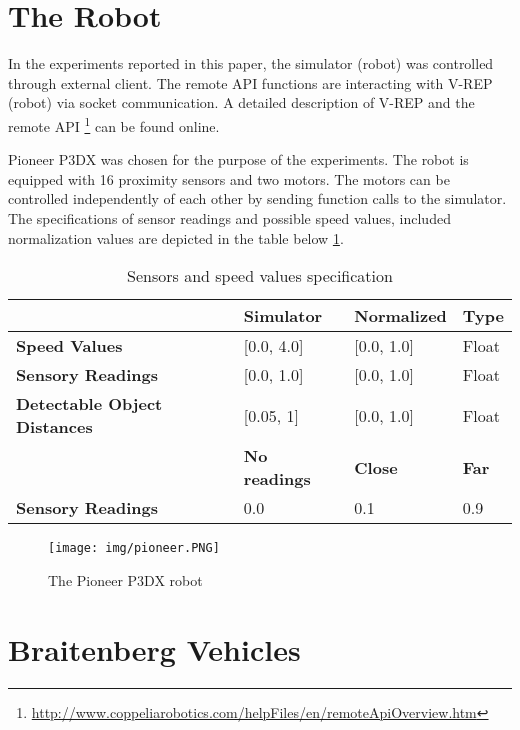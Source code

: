 \documentclass[format=acmsmall, review=false, screen=true]{acmart}
\begin{document}
\section{The Robot}

In the experiments reported in this paper, the simulator (robot) was controlled through external client. The remote API functions are interacting with V-REP (robot) via socket communication. A detailed description of V-REP and the remote API \footnote{\url{http://www.coppeliarobotics.com/helpFiles/en/remoteApiOverview.htm}} can be found online.

Pioneer P3DX was chosen for the purpose of the experiments. The robot is equipped with 16 proximity sensors and two motors. The motors can be controlled independently of each other by sending function calls to the simulator. The specifications of sensor readings and possible speed values, included normalization values are depicted in the table below \ref{fig:specs}.

\begin{table}[H]
\begin{tabular}{llll}
\hline
\textbf{}                            & \textbf{Simulator}   & \textbf{Normalized} & \textbf{Type} \\ \hline
\textbf{Speed Values}                & {[}0.0, 4.0{]}       & {[}0.0, 1.0{]}      & Float         \\
\textbf{Sensory Readings}            & {[}0.0, 1.0{]}       & {[}0.0, 1.0{]}      & Float         \\
\textbf{Detectable Object Distances} & {[}0.05, 1{]}        & {[}0.0, 1.0{]}      & Float         \\
\textbf{}                            & \textbf{No readings} & \textbf{Close}      & \textbf{Far}  \\
\textbf{Sensory Readings}            & 0.0                  & 0.1                 & 0.9          
\end{tabular}
\caption{Sensors and speed values specification}
\label{fig:specs}
\end{table}

\begin{figure}[H]
  \texttt{[image: img/pioneer.PNG]}
  \caption{The Pioneer P3DX robot}
  \label{fig:pioneer-robot}
\end{figure}

\section{Braitenberg Vehicles}
\end{document}
